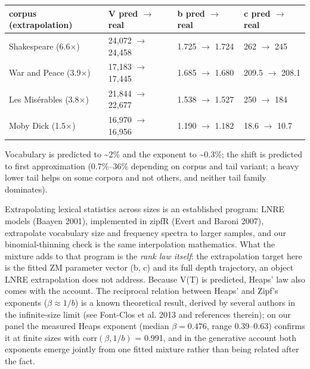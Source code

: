\documentclass[11pt]{article}
\begin{document}
\begin{center}\small\begin{tabular}{llll}\toprule
corpus (extrapolation) & V pred $\to$ real & b pred $\to$ real & c pred $\to$ real \\ \midrule
Shakespeare (6.6$\times$) & 24,072 $\to$ 24,458 & 1.725 $\to$ 1.724 & 262 $\to$ 245 \\
War and Peace (3.9$\times$) & 17,183 $\to$ 17,445 & 1.685 $\to$ 1.680 & 209.5 $\to$ 208.1 \\
Les Misérables (3.8$\times$) & 21,844 $\to$ 22,677 & 1.538 $\to$ 1.527 & 250 $\to$ 184 \\
Moby Dick (1.5$\times$) & 16,970 $\to$ 16,956 & 1.190 $\to$ 1.182 & 18.6 $\to$ 10.7 \\
\bottomrule\end{tabular}\end{center}
Vocabulary is predicted to \~{}2\% and the exponent to \~{}0.3\%; the shift is predicted to first approximation (0.7\%--36\% depending on corpus and tail variant; a heavy lower tail helps on some corpora and not others, and neither tail family dominates).

Extrapolating lexical statistics across sizes is an established program: LNRE models (Baayen 2001), implemented in zipfR (Evert and Baroni 2007), extrapolate vocabulary size and frequency spectra to larger samples, and our binomial-thinning check is the same interpolation mathematics. What the mixture adds to that program is the \emph{rank law itself}: the extrapolation target here is the fitted ZM parameter vector (b, c) and its full depth trajectory, an object LNRE extrapolation does not address. Because V(T) is predicted, Heaps' law also comes with the account. The reciprocal relation between Heaps' and Zipf's exponents ($\beta \approx 1/b$) is a known theoretical result, derived by several authors in the infinite-size limit (see Font-Clos et al. 2013 and references therein); on our panel the measured Heaps exponent (median $\beta = 0.476$, range 0.39--0.63) confirms it at finite sizes with $\mathrm{corr}(\beta, 1/b)$ = 0.991, and in the generative account both exponents emerge jointly from one fitted mixture rather than being related after the fact.
\end{document}
